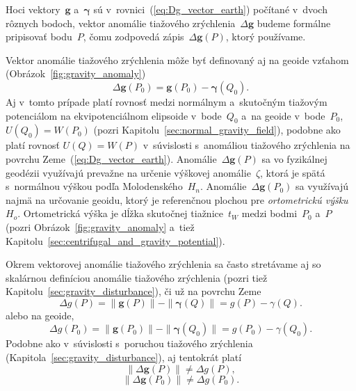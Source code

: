 \documentclass[a4paper,12pt]{book}
\let\vec\mathbf
\begin{document}
Hoci vektory~$\vec g$ a~$\boldsymbol\gamma$ sú 
v~rovnici~(\ref{eq:Dg_vector_earth}) počítané v~dvoch rôznych bodoch, vektor 
anomálie tiažového zrýchlenia~$\Delta \vec g$ budeme formálne pripisovať 
bodu~$P$, čomu zodpovedá zápis~$\Delta \vec g(P)$, ktorý používame.

Vektor anomálie tiažového zrýchlenia môže byť definovaný aj na geoide vzťahom 
(Obrázok~\ref{fig:gravity_anomaly})
%
\begin{equation}
\label{eq:Dg_vector_geoid}
\Delta \vec g(P_0) = \vec g(P_0) - \boldsymbol\gamma(Q_0){.}
\end{equation}
%
Aj v~tomto prípade platí rovnosť medzi normálnym a~skutočným tiažovým 
potenciálom na ekvipotenciálnom elipsoide v~bode~$Q_0$ a~na geoide 
v~bode~$P_0$, $U(Q_0) = W(P_0)$ (pozri 
Kapitolu~\ref{sec:normal_gravity_field}), podobne ako platí rovnosť $U(Q) 
= W(P)$ v~súvislosti s~anomáliou tiažového zrýchlenia na povrchu 
Zeme~(\ref{eq:Dg_vector_earth}).  Anomálie~$\Delta \vec g(P)$ sa vo fyzikálnej 
geodézii využívajú prevažne na určenie výškovej anomálie~$\zeta$, ktorá je 
spätá s~normálnou výškou podľa Molodenského~$H_n$.  Anomálie~$\Delta \vec 
g(P_0)$ sa využívajú najmä na určovanie geoidu, ktorý je referenčnou plochou 
pre \emph{ortometrickú výšku}~$H_o$.  Ortometrická výška je dĺžka skutočnej 
tiažnice~$t_W$ medzi bodmi~$P_0$ a~$P$ (pozri Obrázok~\ref{fig:gravity_anomaly} 
a~tiež Kapitolu~\ref{sec:centrifugal_and_gravity_potential}).

Okrem vektorovej anomálie tiažového zrýchlenia sa často stretávame aj so 
skalárnou definíciou anomálie tiažového zrýchlenia (pozri tiež 
Kapitolu~\ref{sec:gravity_disturbance}), či už na povrchu Zeme
%
\begin{equation}
\label{eq:Dg_scalar_earth}
\Delta g(P) = \| \vec g(P) \| - \| \boldsymbol \gamma (Q) \| = g(P) 
- \gamma(Q){.}
\end{equation}
%
alebo na geoide,
%
\begin{equation}
\label{eq:Dg_scalar_geoid}
\Delta g(P_0) = \| \vec g(P_0) \| - \| \boldsymbol \gamma (Q_0) \| = g(P_0) 
- \gamma(Q_0){.}
\end{equation}
%
Podobne ako v~súvislosti s~poruchou tiažového zrýchlenia 
(Kapitola~\ref{sec:gravity_disturbance}), aj tentokrát platí
%
\begin{equation}
\| \Delta \vec g(P) \| \neq \Delta g(P){,}
\end{equation}
%
\begin{equation}
\| \Delta \vec g(P_0) \| \neq \Delta g(P_0){.}
\end{equation}
\end{document}
